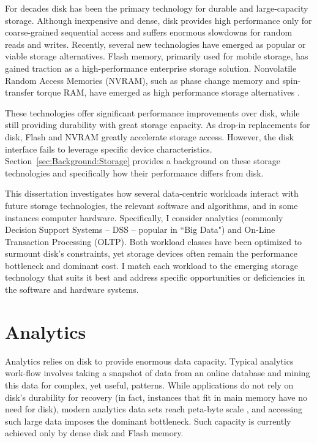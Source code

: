 For decades disk has been the primary technology for durable and large-capacity storage.
Although inexpensive and dense, disk provides high performance only for coarse-grained sequential access and suffers enormous slowdowns for random reads and writes.
Recently, several new technologies have emerged as popular or viable storage alternatives.
Flash memory, primarily used for mobile storage, has gained traction as a high-performance enterprise storage solution.
Nonvolatile Random Access Memories (NVRAM), such as phase change memory and spin-transfer torque RAM, have emerged as high performance storage alternatives \cite{BurrKurdi08}.

These technologies offer significant performance improvements over disk, while still providing durability with great storage capacity.
As drop-in replacements for disk, Flash and NVRAM greatly accelerate storage access.
However, the disk interface fails to leverage specific device characteristics.
Section~\ref{sec:Background:Storage} provides a background on these storage technologies and specifically how their performance differs from disk.

This dissertation investigates how several data-centric workloads interact with future storage technologies, the relevant software and algorithms, and in some instances computer hardware.
Specifically, I consider analytics (commonly Decision Support Systems -- DSS -- popular in ``Big Data") and On-Line Transaction Processing (OLTP).
Both workload classes have been optimized to surmount disk's constraints, yet storage devices often remain the performance bottleneck and dominant cost.
I match each workload to the emerging storage technology that suits it best and address specific opportunities or deficiencies in the software and hardware systems.

\section{Analytics}
\label{sec:Intro:Analytics}

Analytics relies on disk to provide enormous data capacity.
Typical analytics work-flow involves taking a snapshot of data from an online database and mining this data for complex, yet useful, patterns.
While applications do not rely on disk's durability for recovery (in fact, instances that fit in main memory have no need for disk), modern analytics data sets reach peta-byte scale \cite{Economist10}, and accessing such large data imposes the dominant bottleneck.
Such capacity is currently achieved only by dense disk and Flash memory.

